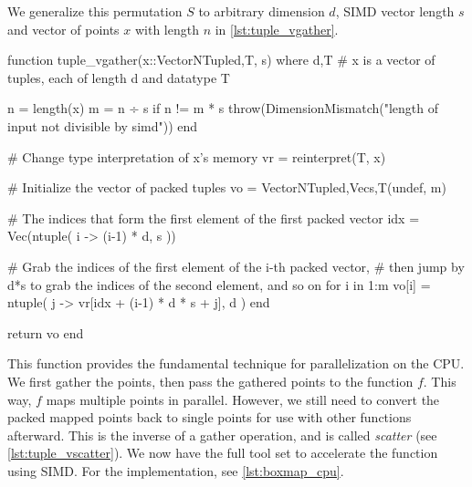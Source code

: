 We generalize this permutation $S$ to arbitrary dimension $d$, SIMD vector length $s$ and 
vector of points $x$ with length $n$ in \autoref{lst:tuple_vgather}. \\

\begin{jllisting}[float, floatplacement=ht!, language=julia, style=jlcodestyle, label=lst:tuple_vgather, caption=Conversion function to packed tuples]
    function tuple_vgather(x::Vector{NTuple{d,T}}, s) where {d,T}
        # x is a vector of tuples, each of length d and datatype T
    
        n = length(x)                                   
        m = n ÷ s
        if n != m * s
            throw(DimensionMismatch("length of input not divisible by simd"))
        end
    
        # Change type interpretation of x's memory
        vr = reinterpret(T, x)
    
        # Initialize the vector of packed tuples
        vo = Vector{NTuple{d,Vec{s,T}}}(undef, m)
    
        # The indices that form the first element of the first packed vector
        idx = Vec(ntuple( i -> (i-1) * d, s ))
    
        # Grab the indices of the first element of the i-th packed vector, 
        # then jump by d*s to grab the indices of the second element, and so on
        for i in 1:m
            vo[i] = ntuple( j -> vr[idx + (i-1) * d * s + j], d )
        end                                             
        
        return vo
    end
\end{jllisting}

This function provides the fundamental technique for parallelization on the CPU. We first 
gather the points, then pass the gathered points to the function $f$. 
This way, $f$ maps multiple points in parallel. 
However, we still need to convert the packed mapped points back to single points for use with other 
functions afterward. This is the inverse of a gather operation, and is called 
\emph{scatter} (see \autoref{lst:tuple_vscatter}). We now have the full tool set 
to accelerate the function  using SIMD. For the implementation, 
see \autoref{lst:boxmap_cpu}. \\


